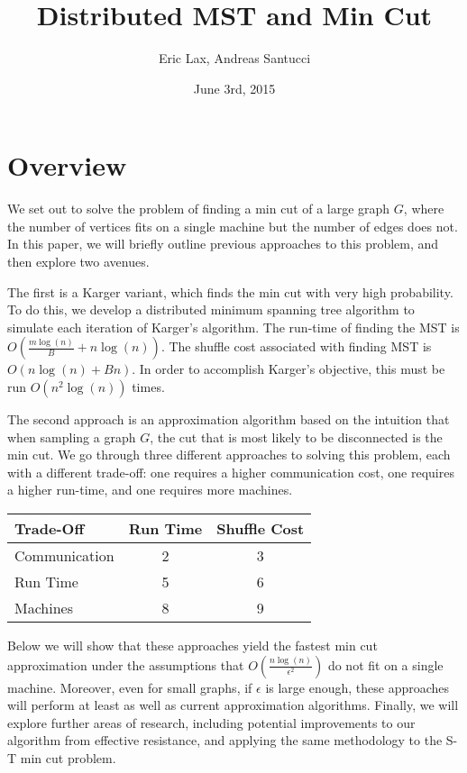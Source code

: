 \documentclass[12pt]{article}
\begin{document}
 

\title{\textbf{Distributed MST and Min Cut}}
\author{Eric Lax, Andreas Santucci}
\date{June 3rd, 2015}
\maketitle

\section*{Overview}

We set out to solve the problem of finding a min cut of a large graph $G$, where the number of vertices fits on a single machine but the number of edges does not. In this paper, we will briefly outline previous approaches to this problem, and then explore two avenues. 

The first is a Karger variant, which finds the min cut with very high probability. To do this, we develop a distributed minimum spanning tree algorithm to simulate each iteration of Karger's algorithm. The run-time of finding the MST is $O(\frac{m \log(n)}{B} + n \log(n))$.
The shuffle cost associated with finding MST is $O(n \log(n) + Bn)$. In order to accomplish Karger's objective, this must be run $O(n^2 \log(n))$ times. 

The second approach is an approximation algorithm based on the intuition that when sampling a graph $G$, the cut that is most likely to be disconnected is the min cut. We go through three different approaches to solving this problem, each with a different trade-off: one requires a higher communication cost, one requires a higher run-time, and one requires more machines.

\begin{center}
\begin{tabular}{ l | c | c }
  Trade-Off & Run Time & Shuffle Cost \\
\hline
  Communication & 2 & 3 \\
  Run Time & 5 & 6 \\
  Machines & 8 & 9 \\
\hline
\end{tabular}
\end{center}

Below we will show that these approaches yield the fastest min cut approximation under the assumptions that $O(\frac{n\log(n)}{\epsilon^2})$ do not fit on a single machine. Moreover, even for small graphs, if $\epsilon$ is large enough, these approaches will perform at least as well as current approximation algorithms. Finally, we will explore further areas of research, including potential improvements to our algorithm from effective resistance, and applying the same methodology to the S-T min cut problem.
\end{document}
